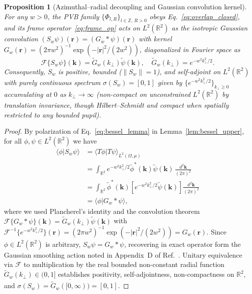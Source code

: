 \documentclass[aps,pra,onecolumn,notitlepage,11pt,tightenlines,nofootinbib,floatfix,longbibliography]{revtex4-2}
\newtheorem{proposition}{Proposition}
\theoremstyle{remark}
\newcommand{\braket}[2]{\langle #1 | #2 \rangle}
\newcommand{\norm}[1]{\lVert #1 \rVert}
\newcommand{\abs}[1]{\lvert #1 \rvert}
\begin{document}
\begin{proposition}[Azimuthal--radial decoupling and Gaussian convolution kernel]
\label{prop:conv_kernel}
For any $w > 0$, the PVB family $\{\Phi_{l,R}\}_{l\in\mathbb{Z},\,R>0}$ obeys Eq.~\eqref{eq:overlap_closed}, and its frame operator~\eqref{eq:frame_op} acts on $L^2(\mathbb{R}^2)$ as the isotropic Gaussian convolution $(S_w\psi)(\mathbf{r}) = (G_w * \psi)(\mathbf{r})$ with kernel $G_w(\mathbf{r}) = (2\pi w^2)^{-1}\exp(-\abs{\mathbf{r}}^2/(2w^2))$, diagonalized in Fourier space as
\begin{equation}
\mathcal{F}\{S_w\psi\}(\mathbf{k}) = \widetilde{G}_w(k_\perp)\widetilde{\psi}(\mathbf{k}), \quad \widetilde{G}_w(k_\perp) = e^{-w^2 k_\perp^2/2}.
\label{eq:fourier_diag}
\end{equation}
Consequently, $S_w$ is positive, bounded ($\norm{S_w} = 1$), and self-adjoint on $L^2(\mathbb{R}^2)$ with purely continuous spectrum $\sigma(S_w) = [0,1]$ given by $\{e^{-w^2 k_\perp^2/2}\}_{k_\perp \ge 0}$ accumulating at $0$ as $k_\perp \to \infty$ (non-compact on unconstrained $L^2(\mathbb{R}^2)$ by translation invariance, though Hilbert--Schmidt and compact when spatially restricted to any bounded pupil).
\end{proposition}
\begin{proof}
By polarization of Eq.~\eqref{eq:bessel_lemma} in Lemma~\ref{lem:bessel_upper}, for all $\phi,\psi \in L^2(\mathbb{R}^2)$ we have
\begin{align}
\braket{\phi}{S_w\psi} &= \braket{T\phi}{T\psi}_{L^2(\Omega,\mu)} \nonumber \\
&= \int_{\mathbb{R}^2} e^{-w^2 k_\perp^2/2}\widetilde{\phi}^*(\mathbf{k})\widetilde{\psi}(\mathbf{k})\,\frac{d^2\mathbf{k}}{(2\pi)^2} \nonumber \\
&= \int_{\mathbb{R}^2} \widetilde{\phi}^*(\mathbf{k})\!\left[e^{-w^2 k_\perp^2/2}\widetilde{\psi}(\mathbf{k})\right]\frac{d^2\mathbf{k}}{(2\pi)^2} \nonumber \\
&= \braket{\phi}{G_w * \psi},
\label{eq:prop1_polarization}
\end{align}
where we used Plancherel's identity and the convolution theorem $\mathcal{F}\{G_w * \psi\}(\mathbf{k}) = \widetilde{G}_w(k_\perp)\widetilde{\psi}(\mathbf{k})$ with $\mathcal{F}^{-1}\{e^{-w^2 k_\perp^2/2}\}(\mathbf{r}) = \allowbreak (2\pi w^2)^{-1}\exp(-\abs{\mathbf{r}}^2/(2w^2)) = G_w(\mathbf{r})$. Since $\phi \in L^2(\mathbb{R}^2)$ is arbitrary, $S_w\psi = G_w * \psi$, recovering in exact operator form the Gaussian smoothing action noted in Appendix~D of Ref.~\cite{Ferreira2026}. Unitary equivalence via $\mathcal{F}$ to multiplication by the real bounded non-constant radial function $\widetilde{G}_w(k_\perp) \in (0,1]$ establishes positivity, self-adjointness, non-compactness on $\mathbb{R}^2$, and $\sigma(S_w) = \overline{\widetilde{G}_w([0,\infty))} = [0,1]$.
\end{proof}
\end{document}
